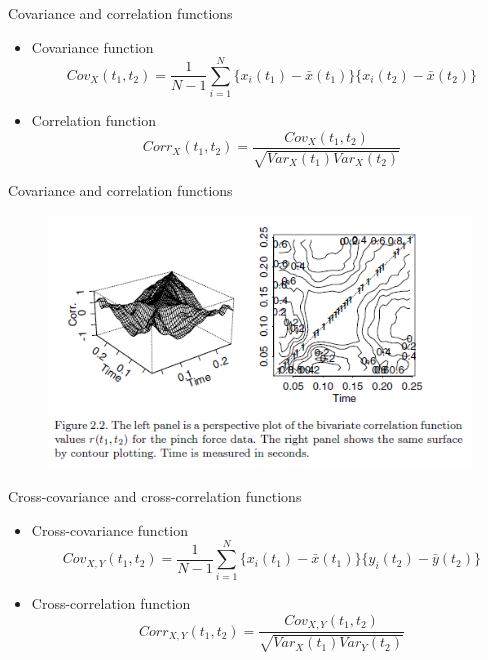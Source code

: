 \documentclass{beamer}
\begin{document}
\begin{frame}{Covariance and correlation functions}
	\begin{itemize}
		\item {
			Covariance function
			$$ Cov_X(t_1, t_2)=\frac{1}{N-1}\sum_{i=1}^{N}\{x_i(t_1)-\bar{x}(t_1)\}\{x_i(t_2)-\bar{x}(t_2)\} $$
		}
		\item {
			Correlation function
			$$ Corr_X(t_1, t_2)=\frac{Cov_X(t_1, t_2)}{\sqrt{Var_X(t_1)Var_X(t_2)}} $$
		}
	\end{itemize}
\end{frame}

\begin{frame}{Covariance and correlation functions}
	\begin{figure}[h] %
		\begin{center}
			\includegraphics[width=1\linewidth]{img/2.png}
		\end{center}
		\label{fig:long}
		\label{fig:onecol}
	\end{figure}	
\end{frame}

\begin{frame}{Cross-covariance and cross-correlation functions}
	\begin{itemize}
		\item {
			Cross-covariance function
			$$ Cov_{X,Y}(t_1, t_2)=\frac{1}{N-1}\sum_{i=1}^{N}\{x_i(t_1)-\bar{x}(t_1)\}\{y_i(t_2)-\bar{y}(t_2)\} $$
		}
		\item {
			Cross-correlation function
			$$ Corr_{X,Y}(t_1, t_2)=\frac{Cov_{X,Y}(t_1, t_2)}{\sqrt{Var_X(t_1)Var_Y(t_2)}} $$
		}
	\end{itemize}
\end{frame}
\end{document}
